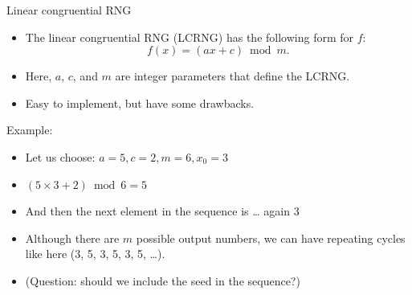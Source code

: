\documentclass[10pt]{beamer}
\begin{document}
\begin{frame}[label={sec:org055eaf8}]{Linear congruential RNG}
\begin{itemize}
\item The \alert{linear congruential RNG} (LCRNG) has the following form for \(f\):
$$f(x) = (a x + c) \bmod m.$$
\item Here, \(a\), \(c\), and \(m\) are integer parameters that define the LCRNG.
\item Easy to implement, but have some drawbacks.
\end{itemize}
\end{frame}
\begin{frame}[label={sec:org95cf343}]{Example:}
\begin{itemize}
\item Let us choose: \(a = 5, c = 2, m = 6, x_0 = 3\)
\item \((5 \times 3 + 2) \bmod 6 = 5\)
\item And then the next element in the sequence is \ldots{} again \(3\)
\item Although there are \(m\) possible output numbers, we can have \alert{repeating cycles}
like here (3, 5, 3, 5, 3, 5, \ldots{}).

\item (Question: should we include the seed in the sequence?)
\end{itemize}
\end{frame}
\end{document}

